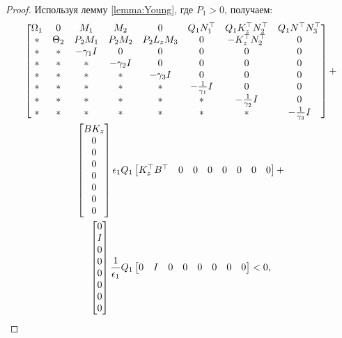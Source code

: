 \begin{proof}
	Используя лемму \ref{lemma:Young}, где $P_1>0$, получаем:
	\begin{multline}
		\label{eq:after_Young}
		\begin{bmatrix}
			{\Omega}_1 & 0 & {M}_1 & {M}_2 & 0& {Q}_1{N}_1^\top & {Q}_1{K}_z^\top{N}_2^\top & {Q}_1 {N}^\top{N}_3^\top 
			\\
			* & {\Theta}_2 & {P}_2{M}_1 & {P}_2{M}_2 & {P}_2{L}_z{M}_3 & 0 & -{K}_z^\top{N}_2^\top & 0\\
			* & * & -\gamma_1{I} & 0&0&0&0&0\\
			* & * & * & -\gamma_2{I}&0&0&0&0\\
			* & * & * & *&-\gamma_3{I}&0&0&0\\
			* & * & * & *&*&-\frac{1}{\gamma_1}{I}&0&0\\
			* & * & * & *&*&*&-\frac{1}{\gamma_2}{I}&0\\
			*&* & * & * & *&*&*&-\frac{1}{\gamma_3}{I}
		\end{bmatrix}
		+
		\\
		\begin{bmatrix}
			B K_z \\0\\0\\0\\0\\0\\0\\0
		\end{bmatrix}
		\epsilon_1 Q_1
		\begin{bmatrix}
			K_z^\top B^\top & 0 & 0&0&0&0&0&0
		\end{bmatrix}
		+
		\\
		\begin{bmatrix}
			0 \\I\\0\\0\\0\\0\\0\\0
		\end{bmatrix}
		\frac{1}{\epsilon_1}{Q}_1
		\begin{bmatrix}
			0 & I & 0&0&0&0&0&0
		\end{bmatrix}
		<0,
	\end{multline}
	

\end{proof}
